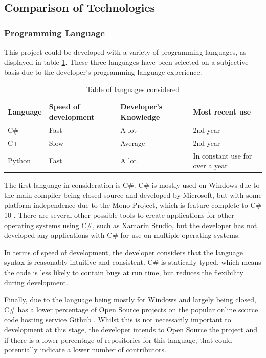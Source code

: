 \subsection{Comparison of Technologies}
\subsubsection{Programming Language}
This project could be developed with a variety of programming languages, as displayed in table \ref{table:langs}. These three languages have been selected on a subjective basis due to the developer's programming language experience.

\begin{table}[H]
\centering
\begin{tabular}{| l | l | l | l |} \hline
  {Language} & {Speed of development} & {Developer's Knowledge} & {Most recent use} \\ \hline
  C\# & Fast & A lot & 2nd year \\ \hline
  C++ & Slow & Average & 2nd year \\ \hline
  Python & Fast & A lot & In constant use for over a year \\ \hline
  
\end{tabular}
\caption{Table of languages considered}
\label{table:langs}
\end{table}
The first language in consideration is C\#. C\# is mostly used on Windows due to the main compiler being closed source and developed by Microsoft, but with some platform independence due to the Mono Project, which is feature-complete to C\# 10 \parencite{MonoDev}. There are several other possible tools to create applications for other operating systems using C\#, such as Xamarin Studio, but the developer has not developed any applications with C\# for use on multiple operating systems. 

In terms of speed of development, the developer considers that the language syntax is reasonably intuitive and consistent. C\# is statically typed, which means the code is less likely to contain bugs at run time, but reduces the flexibility during development.

Finally, due to the language being mostly for Windows and largely being closed, C\# has a lower percentage of Open Source projects on the popular online source code hosting service Github \parencite{Redmonk}. Whilst this is not necessarily important to development at this stage, the developer intends to Open Source the project and if there is a lower percentage of repositories for this language, that could potentially indicate a lower number of contributors.

